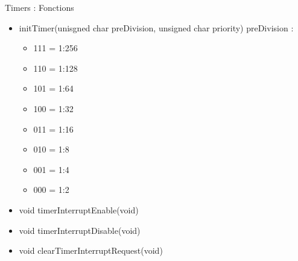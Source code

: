 \begin{frame}{Timers : Fonctions}

\begin{itemize}
\itemsep1pt\parskip0pt
\item
  initTimer(unisgned char preDivision, unsigned char priority)
  preDivision :

  \begin{itemize}
  \itemsep1pt\parskip0pt
  \item
    111 = 1:256
  \item
    110 = 1:128
  \item
    101 = 1:64
  \item
    100 = 1:32
  \item
    011 = 1:16
  \item
    010 = 1:8
  \item
    001 = 1:4
  \item
    000 = 1:2
  \end{itemize}
\item
  void timerInterruptEnable(void)
\item
  void timerInterruptDisable(void)
\item
  void clearTimerInterruptRequest(void)
\end{itemize}

\end{frame}
